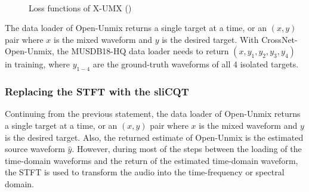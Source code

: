 \documentclass[report.tex]{subfiles}
\begin{document}
\begin{figure}[ht]
	\centering
	\\
	\caption{Loss functions of X-UMX (\cite[2]{xumx})}
	\label{fig:xumxlosses}
\end{figure}

The data loader of Open-Unmix returns a single target at a time, or an $(x, y)$ pair where $x$ is the mixed waveform and $y$ is the desired target. With CrossNet-Open-Unmix, the MUSDB18-HQ data loader needs to return $(x, y_{1}, y_{2}, y_{3}, y_{4})$ in training, where $y_{1-4}$ are the ground-truth waveforms of all 4 isolated targets.

\newpagefill

\subsubsection{Replacing the STFT with the sliCQT}
\label{sec:replacestft}

Continuing from the previous statement, the data loader of Open-Unmix returns a single target at a time, or an $(x, y)$ pair where $x$ is the mixed waveform and $y$ is the desired target. Also, the returned estimate of Open-Unmix is the estimated source waveform $\hat{y}$. However, during most of the steps between the loading of the time-domain waveforms and the return of the estimated time-domain waveform, the STFT is used to transform the audio into the time-frequency or spectral domain.
\end{document}
